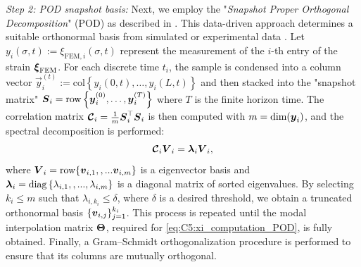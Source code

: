 \textit{Step 2: POD snapshot basis:} Next, we employ the "\textit{Snapshot Proper Orthogonal Decomposition}" (POD) as described in \cite{Duriez2016,Goury2018}. This data-driven approach determines a suitable orthonormal basis from simulated or experimental data \cite{Astrid2008}. Let $y_{i}(\sigma,t) := \xi_{\textrm{FEM},i}(\sigma,t)$ represent the measurement of the $i$-th entry of the strain ${\boldsymbol{\xi}}_{\textrm{FEM}}$. For each discrete time $t_i$, the sample is condensed into a column vector $\vec{y}_i^{(t)} := \textrm{col}\left\{y_i(0,t),\dots,y_i(L,t) \right\}$ and then stacked into the "snapshot matrix" $\boldsymbol{S}_i = \textrm{row}\left\{ \boldsymbol{y}_i^{(0)},\dots,\boldsymbol{y}_i^{(T)} \right\}$ where $T$ is the finite horizon time. The correlation matrix $\boldsymbol{\mathcal{C}}_i = \tfrac{1}{m} \boldsymbol{S}_i^\top \boldsymbol{S}_i$ is then computed with $m = \text{dim}({\boldsymbol{y}}_i)$, and the spectral decomposition is performed:
%
\begin{equation}
\boldsymbol{\mathcal{C}}_i {\boldsymbol{V}}_i = \boldsymbol{\lambda}_i {\boldsymbol{V}}_i,
\end{equation}
%
where ${\boldsymbol{V}}_i = \textrm{row}\{{\boldsymbol{v}}_{i,1},,...{\boldsymbol{v}}_{i,m}\}$ is a eigenvector basis and $\boldsymbol{\lambda}_i = \textnormal{diag}\left\{ {\lambda_{i,1},,...,\lambda_{i,m}} \right\}$ is a diagonal matrix of sorted eigenvalues. By selecting $k_i \le m$ such that $\lambda_{i,k_i} \le \delta$, where $\delta$ is a desired threshold, we obtain a truncated orthonormal basis $\{{\boldsymbol{v}}_{i,j}\}_{j=1}^{k_i}$. This process is repeated until the modal interpolation matrix ${\boldsymbol{\Theta}}$, required for \eqref{eq:C5:xi_computation_POD}, is fully obtained. Finally, a Gram–Schmidt orthogonalization procedure is performed to ensure that its columns are mutually orthogonal. \\

